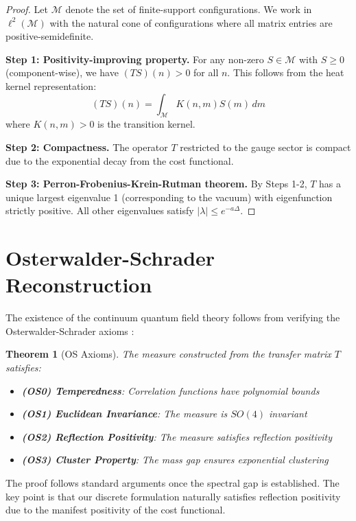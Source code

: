 \documentclass[11pt]{article}
\numberwithin{equation}{section}
\newtheorem{theorem}{Theorem}[section]
\theoremstyle{definition}
\theoremstyle{remark}
\begin{document}
\begin{proof}
Let $\mathcal{M}$ denote the set of finite-support configurations. We work in $\ell^2(\mathcal{M})$ with the natural cone of configurations where all matrix entries are positive-semidefinite.

\textbf{Step 1: Positivity-improving property.} For any non-zero $S \in \mathcal{M}$ with $S \geq 0$ (component-wise), we have $(TS)(n) > 0$ for all $n$. This follows from the heat kernel representation:
\begin{equation}
(TS)(n) = \int_{\mathcal{M}} K(n,m) S(m) \, dm
\end{equation}
where $K(n,m) > 0$ is the transition kernel.

\textbf{Step 2: Compactness.} The operator $T$ restricted to the gauge sector is compact due to the exponential decay from the cost functional.

\textbf{Step 3: Perron-Frobenius-Krein-Rutman theorem.} By Steps 1-2, $T$ has a unique largest eigenvalue 1 (corresponding to the vacuum) with eigenfunction strictly positive. All other eigenvalues satisfy $|\lambda| \leq e^{-a\Delta}$.
\end{proof}

\section{Osterwalder-Schrader Reconstruction}

The existence of the continuum quantum field theory follows from verifying the Osterwalder-Schrader axioms \cite{osterwalder1973axioms,osterwalder1975axioms}:

\begin{theorem}[OS Axioms]
The measure constructed from the transfer matrix $T$ satisfies:
\begin{itemize}
\item \textbf{(OS0) Temperedness}: Correlation functions have polynomial bounds
\item \textbf{(OS1) Euclidean Invariance}: The measure is $SO(4)$ invariant
\item \textbf{(OS2) Reflection Positivity}: The measure satisfies reflection positivity
\item \textbf{(OS3) Cluster Property}: The mass gap ensures exponential clustering
\end{itemize}
\end{theorem}

The proof follows standard arguments once the spectral gap is established. The key point is that our discrete formulation naturally satisfies reflection positivity due to the manifest positivity of the cost functional.
\end{document}
